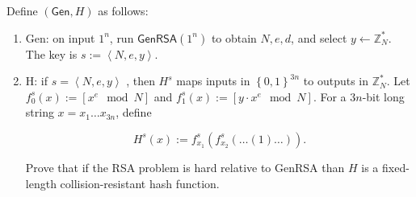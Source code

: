 \documentclass{article}
\begin{document}
\begin{enumerate}
    Define $(\textsf{Gen}, H)$ as follows:

    \begin{enumerate}
      \item \textsf{Gen}: on input $1^n$, run $\textsf{GenRSA}(1^n)$ to obtain
        $N, e, d$, and select $y \leftarrow \mathbb{Z}^{*}_N$. The key is $s := \left<N, e,
        y\right>$.
      \item \textsf{H}: if $s = \left<N, e, y\right>$ , then $H^s$ maps inputs
        in $\left\{0, 1\right\}^{3n}$ to outputs in $\mathbb{Z}^{*}_N$. Let $f_0^s(x) :=
        [x^e \mod N]$ and $f_1^s(x) := [y \cdot x^e \mod N]$. For a $3n$-bit long
        string $x = x_1 \dots x_{3n}$, define

        \[
          H^s(x) := f_{x_1}^s(f_{x_2}^s(\dots(1)\dots)).
        \]

        Prove that if the RSA problem is hard relative to \textsf{GenRSA} than
        $H$ is a fixed-length collision-resistant hash function.
    \end{enumerate}
\end{enumerate}
\end{document}
